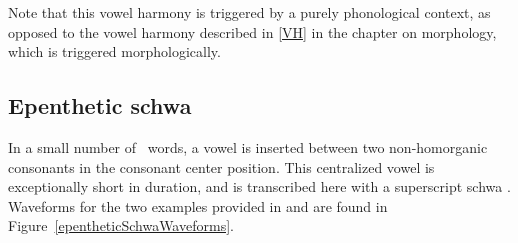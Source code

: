 
Note that this vowel harmony is triggered by a purely phonological context, as opposed to the vowel harmony described in \SEC\ref{VH} in the chapter on morphology, which is triggered morphologically. 


\subsection{Epenthetic schwa}\label{epentheticSchwa}
In a small number of \PS\ words, a vowel is inserted between two non-homorganic consonants in the consonant center position. %
This centralized vowel is exceptionally short in duration, and is transcribed here with a %
superscript schwa \ipa{[ᵊ]}. Waveforms for the two examples provided in  and  are found in Figure~\vref{epentheticSchwaWaveforms}.

